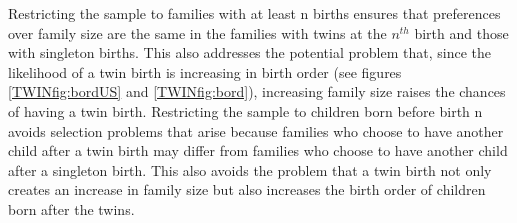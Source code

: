 \documentclass[subeqn]{article}
\begin{document}
\begin{spacing}{1.4}
Restricting the sample to families with at least n births ensures that preferences over family size are the same in the families with twins at the $n^{th}$ birth and those with singleton births. This also addresses the potential problem that, since the likelihood of a twin birth is increasing in birth order (see figures \ref{TWINfig:bordUS} and \ref{TWINfig:bord}), increasing family size raises the chances of having a twin birth. Restricting the sample to children born before birth n avoids selection problems that arise because families who choose to have another child after a twin birth may differ from families who choose to have another child after a singleton birth. This also avoids the problem that a twin birth not only creates an increase in family size but also increases the birth order of children born after the twins.




\end{spacing}
\end{document}
